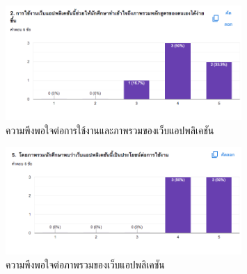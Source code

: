\begin{figure}[H]
    \begin{center}
      \includegraphics[width=0.8\textwidth]{toon1.png}
      \caption{ความพีงพอใจต่อการใช้งานและภาพรวมของเว็บแอปพลิเคชัน}
      \label{fig:toon1}
    \end{center}
\end{figure}

\begin{figure}[H]
    \begin{center}
      \includegraphics[width=0.8\textwidth]{toon2.png}
      \caption{ความพีงพอใจต่อภาพรวมของเว็บแอปพลิเคชัน}
      \label{fig:toon2}
    \end{center}
\end{figure}
    